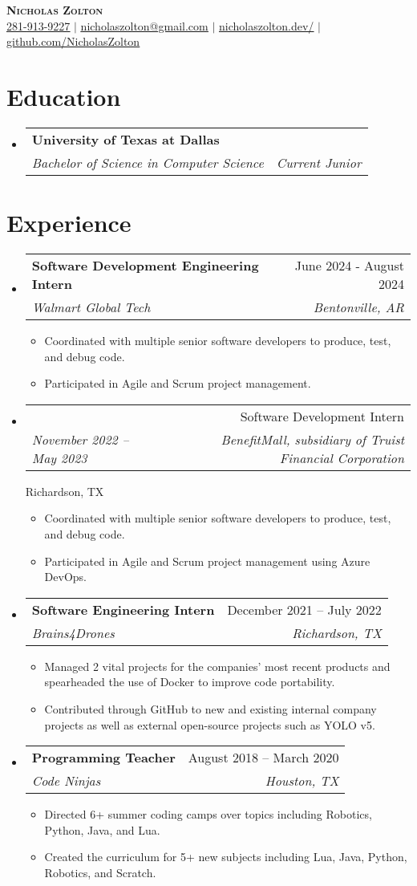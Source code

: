 \documentclass[11pt,letterpaper]{article}%
\makeatletter
\newcommand{\resumeItem}[1]{
  \item\small{
    {#1 \vspace{-2pt}}
  }
}
\newcommand{\resumeSubheading}[4]{
  \vspace{-2pt}\item
    \begin{tabular*}{0.97\textwidth}[t]{l@{\extracolsep{\fill}}r}
      \textbf{#1} & #2 \\
      \textit{\small#3} & \textit{\small #4} \\
    \end{tabular*}\vspace{-7pt}
}
\newcommand{\resumeSubHeadingListStart}{\begin{itemize}[leftmargin=0.15in, label={}]}
\newcommand{\resumeSubHeadingListEnd}{\end{itemize}}
\newcommand{\resumeItemListStart}{\begin{itemize}}
\newcommand{\resumeItemListEnd}{\end{itemize}\vspace{-5pt}}
\makeatother
\begin{document}
%
\normalsize%
\begin{center}
%
    \textbf{\Huge \scshape Nicholas Zolton} \\ \vspace{1pt}
%
    \small \href{tel:281{-}913{-}9227}{\underline{281{-}913{-}9227}} $|$ 
%
    \small \href{mailto:nicholaszolton@gmail.com}{\underline{nicholaszolton@gmail.com}} $|$ 
%
\small \href{https://nicholaszolton.dev/}{\underline{nicholaszolton.dev/}} $|$ 
%
\small \href{https://github.com/NicholasZolton}{\underline{github.com/NicholasZolton}}
%
\end{center}
%
%
\section{Education}
%
\resumeSubHeadingListStart
%
\resumeSubheading
%
{University of Texas at Dallas}{}
%
{Bachelor of Science in Computer Science}{Current Junior}
%
\resumeSubHeadingListEnd
%
%
\section{Experience}
%
  \resumeSubHeadingListStart

    \resumeSubheading
%
      {Software Development Engineering Intern}{June 2024 - August 2024}
%
      {Walmart Global Tech}{Bentonville, AR}
%
      \resumeItemListStart
%
        \resumeItem{Coordinated with multiple senior software developers to produce, test, and debug code.}
%
        \resumeItem{Participated in Agile and Scrum project management.}
%
      \resumeItemListEnd
%
    \resumeSubheading
%
    \resumeSubheading
%
      {Software Development Intern}{November 2022 – May 2023}
%
      {BenefitMall, subsidiary of Truist Financial Corporation}{Richardson, TX}
%
      \resumeItemListStart
%
        \resumeItem{Coordinated with multiple senior software developers to produce, test, and debug code.}
%
        \resumeItem{Participated in Agile and Scrum project management using Azure DevOps.}
%
      \resumeItemListEnd
%
    \resumeSubheading
%
      {Software Engineering Intern}{December 2021 – July 2022}
%
      {Brains4Drones}{Richardson, TX}
%
      \resumeItemListStart
%
        \resumeItem{Managed 2 vital projects for the companies' most recent products and spearheaded the use of Docker to improve code portability.}
%
        \resumeItem{Contributed through GitHub to new and existing internal company projects as well as external open{-}source projects such as YOLO v5.}
%
      \resumeItemListEnd
%
    \resumeSubheading
%
      {Programming Teacher}{August 2018 – March 2020}
%
      {Code Ninjas}{Houston, TX}
%
      \resumeItemListStart
%
        \resumeItem{Directed 6+ summer coding camps over topics including Robotics, Python, Java, and Lua.}
%
        \resumeItem{Created the curriculum for 5+ new subjects including Lua, Java, Python, Robotics, and Scratch.}
%
      \resumeItemListEnd
%
  \resumeSubHeadingListEnd
%
%
\end{document}
